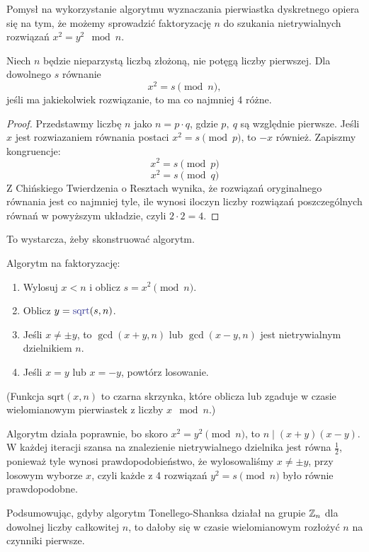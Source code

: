 Pomysł na wykorzystanie algorytmu wyznaczania pierwiastka dyskretnego opiera się na tym, że możemy sprowadzić faktoryzację \( n \) do szukania nietrywialnych rozwiązań \( x^2 = y^2 \mod n \).

\begin{lemma}
Niech \( n \) będzie nieparzystą liczbą złożoną, nie potęgą liczby pierwszej. Dla dowolnego \( s \) równanie
\[
    x^2 = s \pmod{n},
\]
jeśli ma jakiekolwiek rozwiązanie, to ma co najmniej 4 różne.
\end{lemma}
\begin{proof}
    Przedstawmy liczbę \( n \) jako \( n = p \cdot q \), gdzie \( p, \ q \) są względnie pierwsze. Jeśli \( x \) jest rozwiazaniem równania postaci \( x^2 = s \pmod{p} \), to \( -x \) również. Zapiszmy kongruencje:
    \[
        x^2 = s \pmod{p}
    \]
    \[
        x^2 = s \pmod{q}
    \]
    Z Chińskiego Twierdzenia o Resztach wynika, że rozwiązań oryginalnego równania jest co najmniej tyle, ile wynosi iloczyn liczby rozwiązań poszczególnych równań w powyższym układzie, czyli \( 2 \cdot 2 = 4 \).
\end{proof}

To wystarcza, żeby skonstruować algorytm.
\begin{greyframe}
    Algorytm na faktoryzację:
    \begin{enumerate}
        \item Wylosuj \( x < n \) i oblicz \( s = x^2 \pmod{n} \).
        \item Oblicz \( y = \textcolor{Blue}{\text{sqrt}}(s, n) \).
        \item Jeśli \( x \neq \pm y \), to \( \gcd(x + y, n) \) lub \( \gcd(x - y, n) \) jest nietrywialnym dzielnikiem \( n \).
        \item Jeśli \( x = y \) lub \( x = -y \), powtórz losowanie.
    \end{enumerate}
\end{greyframe}
{\small (Funkcja \( \text{sqrt}(x, n) \) to czarna skrzynka, które oblicza lub zgaduje w czasie wielomianowym pierwiastek z liczby \( x \mod n \).)}

Algorytm działa poprawnie, bo skoro \( x^2 = y^2 \pmod{n} \), to \( n \mid (x + y)(x - y) \). W każdej iteracji szansa na znalezienie nietrywialnego dzielnika jest równa \( \frac{1}{2} \), ponieważ tyle wynosi prawdopodobieństwo, że wylosowaliśmy \( x \neq \pm y \), przy losowym wyborze \( x \), czyli każde z 4 rozwiązań \( y^2 = s \pmod{n} \) było równie prawdopodobne.

Podsumowując, gdyby algorytm Tonellego-Shanksa działał na grupie \( \mathbb{Z}_n \) dla dowolnej liczby całkowitej \( n \), to dałoby się w czasie wielomianowym rozłożyć \( n \) na czynniki pierwsze.